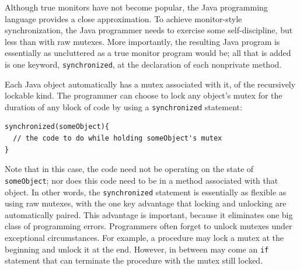 Although true monitors have not become popular, the Java programming
language provides a close approximation.  To achieve monitor-style
synchronization, the Java programmer needs to exercise some self-discipline, but less than with raw mutexes.  More importantly, the
resulting Java program is essentially as uncluttered as a true monitor
program would be; all that is added is one keyword,
\verb|synchronized|, at the declaration of each nonprivate method.

Each Java object automatically has a mutex associated with it, of the
recursively lockable kind.  The programmer can choose to lock any
object's mutex for the duration of any block of code by using a
\verb|synchronized| statement:
\begin{verbatim}
synchronized(someObject){
  // the code to do while holding someObject's mutex
}
\end{verbatim}
Note that in this case, the code need not be operating on the state of
\verb|someObject|; nor does this code need to be in a method
associated with that object.  In other words, the \verb|synchronized|
statement is essentially as flexible as using raw mutexes, with the
one key advantage that locking and unlocking are automatically paired.
This advantage is important, because it eliminates one big class of
programming errors.  Programmers often forget to unlock mutexes under
exceptional circumstances.  For example, a procedure may lock a mutex
at the beginning and unlock it at the end.  However, in between may
come an \verb|if| statement that can terminate the procedure with
the mutex still locked.

